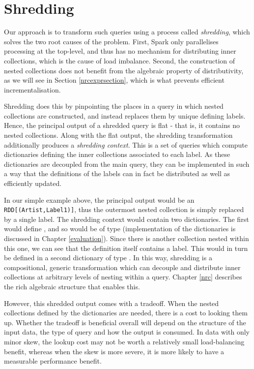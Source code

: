 \section{Shredding} {

Our approach is to transform such queries using a process called \textit{shredding}, which solves the two root causes of the problem. First, Spark only parallelises processing at the top-level, and thus has no mechanism for distributing inner collections, which is the cause of load imbalance.  Second, the construction of nested collections does not benefit from the algebraic property of distributivity, as we will see in Section \ref{nrcexprsection}, which is what prevents efficient incrementalisation.

Shredding does this by pinpointing the places in a query in which nested collections are constructed, and instead replaces them by unique defining labels. Hence, the principal output of a shredded query is flat - that is, it contains no nested collections. Along with the flat output, the shredding transformation additionally produces a \textit{shredding context}. This is a set of queries which compute dictionaries defining the inner collections associated to each label. As these dictionaries are decoupled from the main query, they can be implemented in such a way that the definitions of the labels can in fact be distributed as well as efficiently updated.

In our simple example above, the principal output would be an \lstinline{RDD[(Artist,Label1)]}, thus the outermost nested collection is simply replaced by a single label. The shredding context would contain two dictionaries. The first would define , and so would be of type  (implementation of the dictionaries is discussed in Chapter \ref{evaluation}). Since there is another collection nested within this one, we can see that the definition itself contains a label. This would in turn be defined in a second dictionary of type . In this way, shredding is a compositional, generic transformation which can decouple and distribute inner collections at arbitrary levels of nesting within a query. Chapter \ref{nrc} describes the rich algebraic structure that enables this.

However, this shredded output comes with a tradeoff. When the nested collections defined by the dictionaries are needed, there is a cost to looking them up. Whether the tradeoff is beneficial overall will depend on the structure of the input data, the type of query and how the output is consumed. In data with only minor skew, the lookup cost may not be worth a relatively small load-balancing benefit, whereas when the skew is more severe, it is more likely to have a measurable performance benefit.

}
